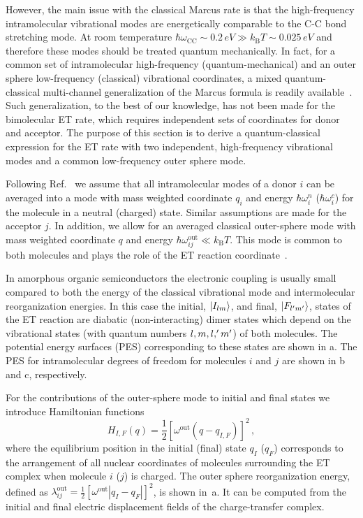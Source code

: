 However, the main issue with the classical Marcus rate is that the high-frequency intramolecular vibrational modes are energetically comparable to the C-C bond stretching mode. At room temperature $\hbar \omega_\text{CC} \sim 0.2\, \unit{eV} \gg k_\text{B}T \sim 0.025\, \unit{eV}$  and therefore these modes should be treated quantum mechanically. In fact, for a common set of intramolecular high-frequency  (quantum-mechanical) and an outer sphere low-frequency (classical) vibrational coordinates, a mixed quantum-classical multi-channel generalization of the Marcus formula is readily available~\cite{may_charge_2003}. Such generalization,  to the best of our knowledge, has not been made for the bimolecular ET rate, which requires independent sets of coordinates for donor and acceptor. The purpose of this section is to derive a quantum-classical expression for the ET rate with two independent, high-frequency vibrational modes and a common low-frequency outer sphere mode. 

Following Ref.~\cite{bredas_charge-transfer_2004} we assume that all intramolecular modes of a donor $i$ can be averaged into a mode with mass weighted coordinate ${q_i}$ and energy $\hbar\omega^{n}_i$ ($\hbar\omega^{c}_i$) for the molecule in a neutral (charged) state. Similar assumptions are made for the acceptor $j$. In addition, we allow for an averaged classical outer-sphere mode with mass weighted coordinate ${q}$ and energy $\hbar\omega^\text{out}_{ij}\ll k_\text{B}T$. This mode is common to both molecules and plays the role of the ET reaction coordinate~\cite{note_outer}.

In amorphous organic semiconductors the electronic coupling is usually small compared to both the energy of the classical vibrational mode and intermolecular reorganization energies. In this case the initial, $ | I_{lm} \rangle$, and final, $| F_{l'm'} \rangle$, states of the ET reaction are diabatic (non-interacting) dimer states which depend on the vibrational states (with quantum numbers $l, m, l, 'm'$) of both molecules. The potential energy surfaces (PES) corresponding to these states are shown in a. The PES for intramolecular degrees of freedom for molecules $i$ and $j$ are shown in b and c, respectively.

For the contributions of the outer-sphere mode to initial and final states we introduce Hamiltonian functions
\begin{equation}
 H_{I,F}(q)=\frac{1}{2}\left[ \omega^\text{out} \left( q-q_{I,F} \right) \right]^2 \, ,
\end{equation}
where the equilibrium position in the initial (final) state $q_I$ ($q_F$) corresponds to the arrangement of all nuclear coordinates of molecules surrounding the ET complex when molecule $i$ ($j$) is charged.  The outer sphere reorganization energy, defined as $\lambda^\text{out}_{ij}=\frac{1}{2}\left[ \omega^\text{out}|q_I-q_F| \right]^2$,  is shown in~a. It can be computed from the initial and final electric displacement fields of the charge-transfer complex. 

